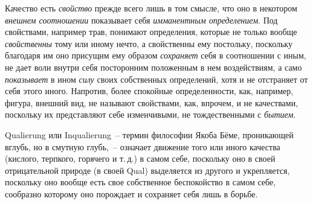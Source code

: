 Качество есть \emph{свойство} прежде всего лишь в том
смысле, что оно в некотором \emph{внешнем соотношении} показывает
себя \emph{имманентным определением}. Под свойствами,
например трав, понимают определения, которые
не только вообще \emph{свойственны} тому или иному нечто,
а свойственны ему постольку, поскольку благодаря им
оно присущим ему образом \emph{сохраняет} себя в соотношении
с иным, не дает воли внутри себя посторонним
положенным в нем воздействиям, а само \emph{показывает} в
ином \emph{силу} своих собственных определений, хотя и не
отстраняет от себя этого иного. Напротив, более спокойные
определенности, как, например, фигура, внешний вид,
не называют свойствами, как, впрочем, и не качествами,
поскольку их представляют себе изменчивыми, не тождественными
с \emph{бытием}.

Qualierung или Inqualierung~-- термин философии
Якоба Бёме, проникающей вглубь, но в смутную глубь,~--
означает движение того или иного качества (кислого,
терпкого, горячего и т.\,д.) в самом себе, поскольку оно
в своей отрицательной природе (в своей Qual\endnotemark{}) выделяется
из другого и укрепляется, поскольку оно вообще
есть свое собственное беспокойство в самом себе, сообразно
которому оно порождает и сохраняет себя лишь
в борьбе.



